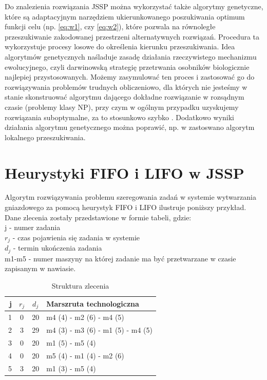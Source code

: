 \documentclass[twoside]{kInzynierka}
\begin{document}
Do znalezienia rozwiązania JSSP można wykorzystać także algorytmy genetyczne, które są adaptacyjnym narzędziem ukierunkowanego poszukiwania optimum funkcji celu (np. \eqref{eq:w1}, czy \eqref{eq:w2}), które pozwala na równoległe przeszukiwanie zakodowanej przestrzeni alternatywnych rozwiązań. Procedura ta wykorzystuje procesy losowe do określenia kierunku przeszukiwania. Idea algorytmów genetycznych naśladuje zasadę działania rzeczywistego mechanizmu ewolucyjnego, czyli darwinowską strategię przetrwania osobników biologicznie najlepiej przystosowanych. Możemy zasymulować ten proces i zastosować go do rozwiązywania problemów trudnych obliczeniowo, dla których nie jesteśmy w stanie skonstruować algorytmu dającego dokładne rozwiązanie w rozsądnym czasie (problemy klasy NP), przy czym w ogólnym przypadku uzyskujemy rozwiązania suboptymalne, za to stosunkowo szybko \cite{grzechca}. Dodatkowo wyniki działania algorytmu genetycznego można poprawić, np. w \cite{genetyczne} zastoswano algorytm lokalnego przeszukiwania.

\section       %
                {Heurystyki FIFO i LIFO w JSSP} %
Algorytm rozwiązywania problemu szeregowania zadań w systemie wytwarzania gniazdowego za pomocą heurystyk FIFO i LIFO ilustruje poniższy przykład. Dane zlecenia zostały przedstawione w formie tabeli, gdzie: \\
j - numer zadania \\
\(r_j\) - czas pojawienia się zadania w systemie \\
\(d_j\) - termin ukończenia zadania \\
m1-m5 - numer maszyny na której zadanie ma być przetwarzane w czasie zapisanym w nawiasie.
\begin{table}[htb]
	\centering
	\caption{Struktura zlecenia}
	\begin{tabular}{ | r | c | c | l | }
	\hline
	j	& \(r_j\)	& \(d_j\)	& Marszruta technologiczna	\\ \hline
	1	& 0	& 20	& m4 (4) - m2 (6) - m4 (5)	\\ \hline
	2	& 3	& 29	& m4 (3) - m3 (6) - m1 (5) - m4 (5)	\\ \hline
	3	& 0	& 20	& m1 (5) - m5 (4)	\\ \hline
	4	& 0	& 20	& m5 (4) - m1 (4) - m2 (6)	\\ \hline
	5	& 3	& 20	& m1 (3) - m5 (4)	\\ \hline
	\end{tabular}
\end{table}
\end{document}
